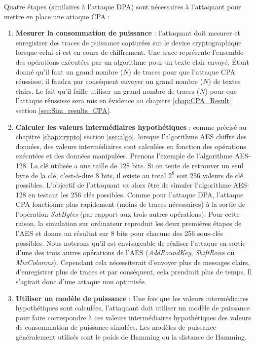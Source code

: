 \documentclass[oneside]{book}
\begin{document}
\newpage

\hspace{-0.5 cm}Quatre étapes (similaires à l'attaque DPA) sont nécessaires à l'attaquant pour mettre en place une attaque CPA : 
\begin{enumerate}
\item \textbf{Mesurer la consommation de puissance} : l'attaquant doit mesurer et enregistrer des traces de puissance capturées sur le device cryptographique lorsque celui-ci est en cours de chiffrement. Une trace représente l'ensemble des opérations exécutées par un algorithme pour un texte clair envoyé. Étant donné qu'il faut un grand nombre ($N$) de traces pour que l'attaque CPA réussisse, il faudra par conséquent envoyer un grand nombre ($N$) de textes clairs. Le fait qu'il faille utiliser un grand nombre de traces ($N$) pour que l'attaque réussisse sera mis en évidence au chapitre \ref{chap:CPA_Result} section \ref{sec:Sim_results_CPA}.
\item \textbf{Calculer les valeurs intermédiaires hypothétiques} : comme précisé au chapitre \ref{chap:crypto} section \ref{sec:algo}, lorsque l'algorithme AES chiffre des données, des valeurs intermédiaires sont calculées en fonction des opérations exécutées et des données manipulées. Prenons l'exemple de l'algorithme AES-128. La clé utilisée a une taille de 128 bits. Si on tente de retrouver un seul byte de la clé, c'est-à-dire 8 bits, il existe au total $2^{8}$ soit 256 valeurs de clé possibles. L'objectif de l'attaquant va alors être de simuler l'algorithme AES-128 en testant les 256 clés possibles. Comme pour l'attaque DPA, l'attaque CPA fonctionne plus rapidement (moins de traces nécessaires) à la sortie de l'opération \textit{SubBytes} \cite{mangard_power_2007} (par rapport aux trois autres opérations). Pour cette raison, la simulation sur ordinateur reproduit les deux premières étapes de l’AES et donne un résultat sur 8 bits pour chacune des 256 sous-clés possibles. Nous noterons qu'il est envisageable de réaliser l'attaque en sortie d'une des trois autres opérations de l'AES (\textit{AddRoundKey}, \textit{ShiftRows} ou \textit{MixColumns}). Cependant cela nécessiterait d'envoyer plus de messages clairs, d'enregistrer plus de traces et par conséquent, cela prendrait plus de temps. Il s'agirait donc d'une attaque non optimisée.
\item \textbf{Utiliser un modèle de puissance} : Une fois que les valeurs intermédiaires hypothétiques sont calculées, l'attaquant doit utiliser un modèle de puissance pour faire correspondre à ces valeurs intermédiaires hypothétiques des valeurs de consommation de puissance simulées. Les modèles de puissance généralement utilisés sont le poids de Hamming ou la distance de Hamming.

\end{enumerate}
\end{document}
